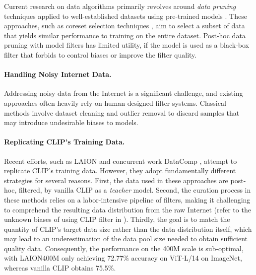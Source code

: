 \documentclass{article} %
\begin{document}
Current research on data algorithms primarily revolves around \textit{data pruning} techniques applied to well-established datasets using pre-trained models \citep{sorscher2022beyond,abbas2023semdedup}. These approaches, such as coreset selection techniques \citep{har2004coresets,feldman2011scalable,bachem2015coresets,mirzasoleiman2020coresets,toneva2018empirical}, aim to select a subset of data that yields similar performance to training on the entire dataset. 
{\color{black}Post-hoc data pruning with model filters has limited utility, if the model is used as a black-box filter that forbids to control biases or improve the filter quality.
}

\paragraph{Handling Noisy Internet Data.}

Addressing noisy data from the Internet is a significant challenge, and existing approaches often heavily rely on human-designed filter systems. Classical methods involve dataset cleaning and outlier removal \citep{jiang2001two,yu2002findout} to discard samples that may introduce undesirable biases to models.

\paragraph{Replicating CLIP's Training Data.}

Recent efforts, such as LAION \citep{schuhmann2021laion,schuhmannlaion} and concurrent work DataComp \citep{gadre2023datacomp}, attempt to replicate CLIP's training data. However, they adopt fundamentally different strategies for several reasons. First, the data used in these approaches are post-hoc, filtered, by vanilla CLIP as a \textit{teacher} model. %
Second, the curation process in these methods relies on a labor-intensive pipeline of filters, making it challenging to comprehend the resulting data distribution from the raw Internet (refer to the unknown biases of using CLIP filter in \citep{schuhmannlaion}). Thirdly, the goal is to match the quantity of CLIP's target data size rather than the data distribution itself, which may lead to an underestimation of the data pool size needed to obtain sufficient quality data. Consequently, the performance on the 400M scale is sub-optimal, with LAION400M only achieving 72.77\% \citep{schuhmann2021laion} accuracy on ViT-L/14 on ImageNet, whereas vanilla CLIP obtains 75.5\%.
\end{document}
